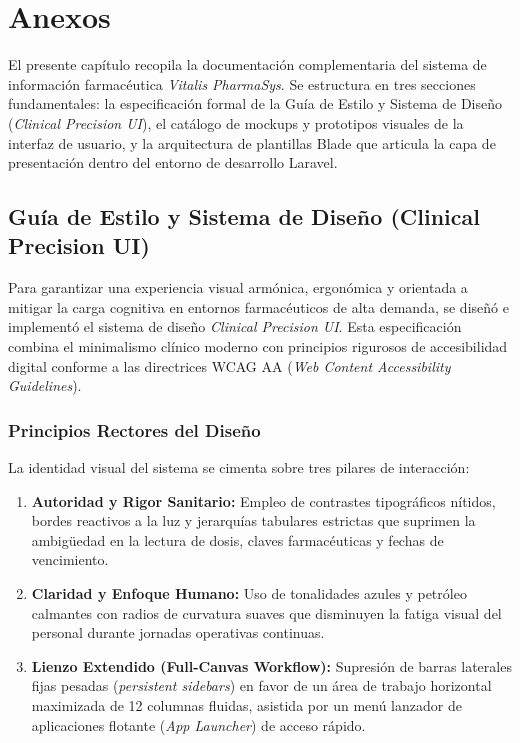 \chapter{Anexos}

El presente capítulo recopila la documentación complementaria del sistema de información farmacéutica \textit{Vitalis PharmaSys}. Se estructura en tres secciones fundamentales: la especificación formal de la Guía de Estilo y Sistema de Diseño (\textit{Clinical Precision UI}), el catálogo de mockups y prototipos visuales de la interfaz de usuario, y la arquitectura de plantillas Blade que articula la capa de presentación dentro del entorno de desarrollo Laravel.

\section{Guía de Estilo y Sistema de Diseño (Clinical Precision UI)}

Para garantizar una experiencia visual armónica, ergonómica y orientada a mitigar la carga cognitiva en entornos farmacéuticos de alta demanda, se diseñó e implementó el sistema de diseño \textit{Clinical Precision UI}. Esta especificación combina el minimalismo clínico moderno con principios rigurosos de accesibilidad digital conforme a las directrices WCAG AA (\textit{Web Content Accessibility Guidelines}).

\subsection{Principios Rectores del Diseño}
La identidad visual del sistema se cimenta sobre tres pilares de interacción:
\begin{enumerate}
    \item \textbf{Autoridad y Rigor Sanitario:} Empleo de contrastes tipográficos nítidos, bordes reactivos a la luz y jerarquías tabulares estrictas que suprimen la ambigüedad en la lectura de dosis, claves farmacéuticas y fechas de vencimiento.
    \item \textbf{Claridad y Enfoque Humano:} Uso de tonalidades azules y petróleo calmantes con radios de curvatura suaves que disminuyen la fatiga visual del personal durante jornadas operativas continuas.
    \item \textbf{Lienzo Extendido (Full-Canvas Workflow):} Supresión de barras laterales fijas pesadas (\textit{persistent sidebars}) en favor de un área de trabajo horizontal maximizada de 12 columnas fluidas, asistida por un menú lanzador de aplicaciones flotante (\textit{App Launcher}) de acceso rápido.
\end{enumerate}

